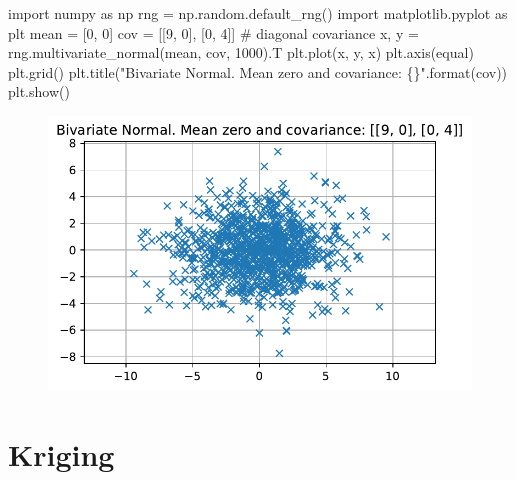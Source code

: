 \documentclass[
  letterpaper,
  DIV=11,
  numbers=noendperiod]{scrreprt}
\newenvironment{Shaded}{\begin{snugshade}}{\end{snugshade}}
\newcommand{\BuiltInTok}[1]{\textcolor[rgb]{0.00,0.23,0.31}{#1}}
\newcommand{\CommentTok}[1]{\textcolor[rgb]{0.37,0.37,0.37}{#1}}
\newcommand{\DecValTok}[1]{\textcolor[rgb]{0.68,0.00,0.00}{#1}}
\newcommand{\ImportTok}[1]{\textcolor[rgb]{0.00,0.46,0.62}{#1}}
\newcommand{\NormalTok}[1]{\textcolor[rgb]{0.00,0.23,0.31}{#1}}
\newcommand{\OperatorTok}[1]{\textcolor[rgb]{0.37,0.37,0.37}{#1}}
\newcommand{\SpecialCharTok}[1]{\textcolor[rgb]{0.37,0.37,0.37}{#1}}
\newcommand{\StringTok}[1]{\textcolor[rgb]{0.13,0.47,0.30}{#1}}
\begin{document}
\begin{Shaded}
\begin{Highlighting}[]
\ImportTok{import}\NormalTok{ numpy }\ImportTok{as}\NormalTok{ np}
\NormalTok{rng }\OperatorTok{=}\NormalTok{ np.random.default\_rng()}
\ImportTok{import}\NormalTok{ matplotlib.pyplot }\ImportTok{as}\NormalTok{ plt}
\NormalTok{mean }\OperatorTok{=}\NormalTok{ [}\DecValTok{0}\NormalTok{, }\DecValTok{0}\NormalTok{]}
\NormalTok{cov }\OperatorTok{=}\NormalTok{ [[}\DecValTok{9}\NormalTok{, }\DecValTok{0}\NormalTok{], [}\DecValTok{0}\NormalTok{, }\DecValTok{4}\NormalTok{]]  }\CommentTok{\# diagonal covariance}
\NormalTok{x, y }\OperatorTok{=}\NormalTok{ rng.multivariate\_normal(mean, cov, }\DecValTok{1000}\NormalTok{).T}
\NormalTok{plt.plot(x, y, }\StringTok{\textquotesingle{}x\textquotesingle{}}\NormalTok{)}
\NormalTok{plt.axis(}\StringTok{\textquotesingle{}equal\textquotesingle{}}\NormalTok{)}
\NormalTok{plt.grid()}
\NormalTok{plt.title(}\StringTok{"Bivariate Normal. Mean zero and covariance: }\SpecialCharTok{\{\}}\StringTok{"}\NormalTok{.}\BuiltInTok{format}\NormalTok{(cov))}
\NormalTok{plt.show()}
\end{Highlighting}
\end{Shaded}

\begin{figure}[H]

{\centering \includegraphics{006_num_gp_files/figure-pdf/cell-30-output-1.pdf}

}

\end{figure}

\hypertarget{kriging}{%
\section{Kriging}\label{kriging}}
\end{document}

